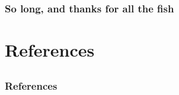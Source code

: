 \documentclass{presentation}
\begin{document}
\appendix
\begin{frame}[plain]
  \frametitle{So long, and thanks for all the fish}
\end{frame}

\section{References}
\subsection{}
\begin{frame}[allowframebreaks]
  \frametitle{References}

  \printbibliography[heading = none]
\end{frame}
\end{document}
